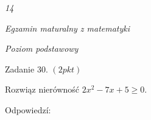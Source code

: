 \documentclass[a4paper,12pt]{article}
\begin{document}
{\it 14}

{\it Egzamin maturalny z matematyki}

{\it Poziom podstawowy}

Zadanie 30. $(2pkt)$

Rozwiąz nierówność $2x^{2}-7x+5\geq 0.$

Odpowiedzí:
\end{document}
